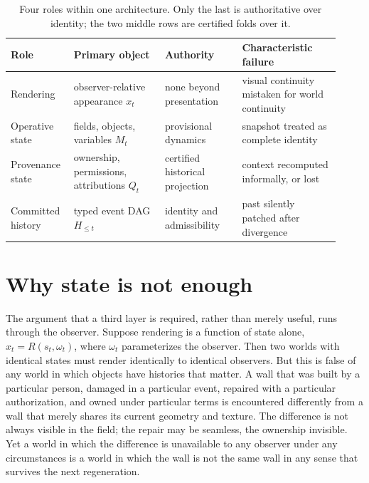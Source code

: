 \documentclass[11pt]{article}
\begin{document}
\begin{table}[h]
\centering
\small
\begin{tabular}{@{}p{0.16\linewidth}p{0.26\linewidth}p{0.22\linewidth}p{0.28\linewidth}@{}}
\toprule
Role & Primary object & Authority & Characteristic failure \\
\midrule
Rendering & observer-relative appearance $x_t$ & none beyond presentation & visual continuity mistaken for world continuity \\
Operative state & fields, objects, variables $M_t$ & provisional dynamics & snapshot treated as complete identity \\
Provenance state & ownership, permissions, attributions $Q_t$ & certified historical projection & context recomputed informally, or lost \\
Committed history & typed event DAG $H_{\leq t}$ & identity and admissibility & past silently patched after divergence \\
\bottomrule
\end{tabular}
\caption{Four roles within one architecture. Only the last is authoritative over identity; the two middle rows are certified folds over it.}
\label{tab:layers}
\end{table}

\section{Why state is not enough}

The argument that a third layer is required, rather than merely useful, runs through the observer. Suppose rendering is a function of state alone, $x_t = R(s_t, \omega_t)$, where $\omega_t$ parameterizes the observer. Then two worlds with identical states must render identically to identical observers. But this is false of any world in which objects have histories that matter. A wall that was built by a particular person, damaged in a particular event, repaired with a particular authorization, and owned under particular terms is encountered differently from a wall that merely shares its current geometry and texture. The difference is not always visible in the field; the repair may be seamless, the ownership invisible. Yet a world in which the difference is unavailable to any observer under any circumstances is a world in which the wall is not the same wall in any sense that survives the next regeneration.
\end{document}
